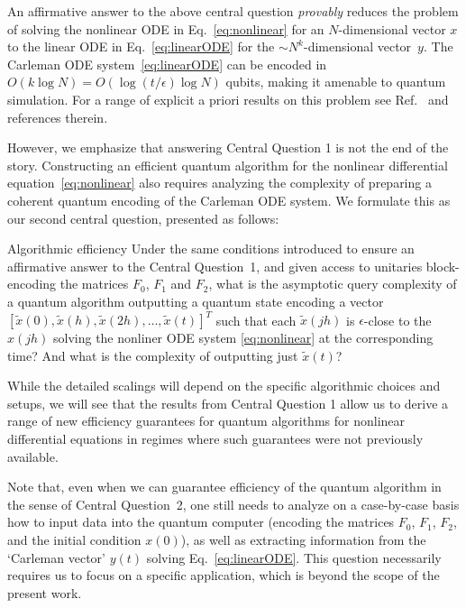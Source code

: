 \documentclass[superscriptaddress,onecolumn,nofootinbib,longbibliography,a4paper,accepted=2026-09-29]{quantumarticle}
\theoremstyle{plain}
\theoremstyle{definition}
\numberwithin{thm}{section}
\numberwithin{assumption}{section}
\numberwithin{lemma}{section}
\numberwithin{prop}{section}
\numberwithin{cor}{section}
\numberwithin{definition}{section}
\numberwithin{rmk}{section}
\numberwithin{equation}{section}
\newcommand{\lrb}[1]{\left ( #1 \right )}
\newcommand{\mylog}[1]{\operatorname{log} \lrb{#1}}
\newcommand{\myO}[1]{O\lrb{#1}}
\begin{document}
An affirmative answer to the above central question \emph{provably} reduces the problem of solving the nonlinear ODE in Eq.~\eqref{eq:nonlinear} for an $N$-dimensional vector $x$ to the linear ODE in Eq.~\eqref{eq:linearODE} for the $\sim N^{k}$-dimensional vector~$y$. The Carleman ODE system~\eqref{eq:linearODE} can be encoded in $\myO{k \log N} = \myO{\mylog{t/\epsilon}\log N}$ qubits, making it amenable to quantum simulation. For a range of explicit a priori results on this problem see Ref.~\cite{forets2017explicit, amini2022carleman, surana2022efficient, liu2021efficient, krovi2023improved, costa2023further, wu2024quantum, chen2024carleman} and references therein.

However, we emphasize that answering Central Question 1 is not the end of the story. Constructing an efficient quantum algorithm for the nonlinear differential equation~\eqref{eq:nonlinear} also requires analyzing the complexity of preparing a coherent quantum encoding of the Carleman ODE system. We formulate this as our second central question, presented as follows:


\begin{questionbox}{Algorithmic efficiency}{}
    Under the same conditions introduced to ensure an affirmative answer to the Central Question~1, and given access to unitaries block-encoding the matrices $F_0$, $F_1$ and $F_2$, what is the asymptotic query complexity of a quantum algorithm outputting a quantum state encoding a vector $[\tilde{x}(0), \tilde{x}(h), \tilde{x}(2h), \dots, \tilde{x}(t)]^T$ 
    such that each  
    $\tilde{x}(j h)$ is $\epsilon$-close to the $x(jh)$ 
    solving the nonliner ODE system \eqref{eq:nonlinear} at the corresponding time? And what is the complexity of outputting just $\tilde{x}(t)$?    
\end{questionbox}

While the detailed scalings will depend on the specific algorithmic choices and setups, we will see that the results from Central Question 1 allow us to derive a range of new efficiency guarantees for quantum algorithms for nonlinear differential equations in regimes where such guarantees were not previously available.

Note that, even when we can guarantee efficiency of the quantum algorithm in the sense of Central Question~2,
one still needs to analyze on a case-by-case basis how  to input data into the quantum computer (encoding the matrices $F_0$, $F_1$, $F_2$, and the initial condition $x(0)$), as well as extracting information from the `Carleman vector' $y(t)$ solving Eq.~\eqref{eq:linearODE}. This question necessarily requires us to focus on a specific application, which is beyond the scope of the present work. 
\end{document}
